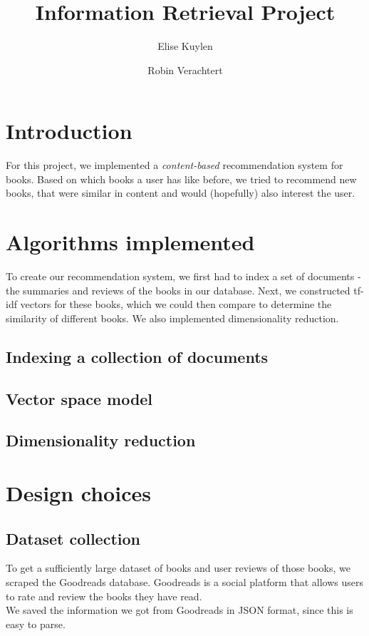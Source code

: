 \documentclass[10pt,a4paper]{paper}
\author{Elise Kuylen \and Robin Verachtert}
\title{Information Retrieval Project}
\begin{document}
\maketitle

\section{Introduction}

For this project, we implemented a \textit{content-based} recommendation system for books. Based on which books a user has like before, we tried to recommend new books, that were similar in content and would (hopefully) also interest the user.

\section{Algorithms implemented}

To create our recommendation system, we first had to index a set of documents - the summaries and reviews of the books in our database. Next, we constructed tf-idf vectors for these books, which we could then compare to determine the similarity of different books. We also implemented dimensionality reduction. %

\subsection{Indexing a collection of documents}

\subsection{Vector space model}

\subsection{Dimensionality reduction}

\section{Design choices}

\subsection{Dataset collection}

To get a sufficiently large dataset of books and user reviews of those books, we scraped the Goodreads database. Goodreads is a social platform that allows users to rate and review the books they have read. \\
We saved the information we got from Goodreads in JSON format, since this is easy to parse.
\end{document}

